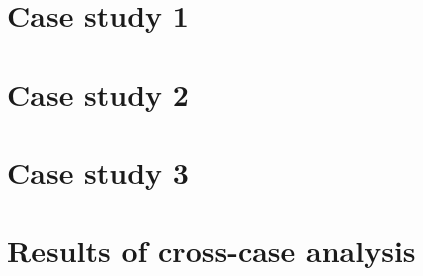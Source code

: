 
\section{Case study 1}

\section{Case study 2}

\section{Case study 3}

\section{Results of cross-case analysis}